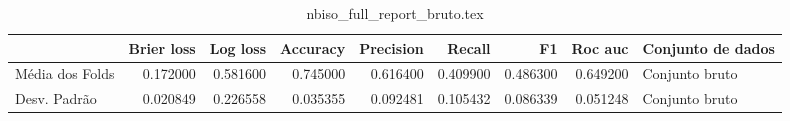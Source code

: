 \begin{table}
\centering
\caption{nbiso_full_report_bruto.tex}
\label{nbiso_full_report_bruto.tex}
\begin{tabular}{lrrrrrrrl}
\toprule
{}              &  Brier  loss &  Log loss &  Accuracy  &  Precision  &   Recall  &       F1  &  Roc auc  & Conjunto de dados \\
\midrule
Média dos Folds &     0.172000 &  0.581600 &   0.745000 &    0.616400 &  0.409900 &  0.486300 &  0.649200 &    Conjunto bruto \\
Desv. Padrão    &     0.020849 &  0.226558 &   0.035355 &    0.092481 &  0.105432 &  0.086339 &  0.051248 &    Conjunto bruto \\
\bottomrule
\end{tabular}
\end{table}

